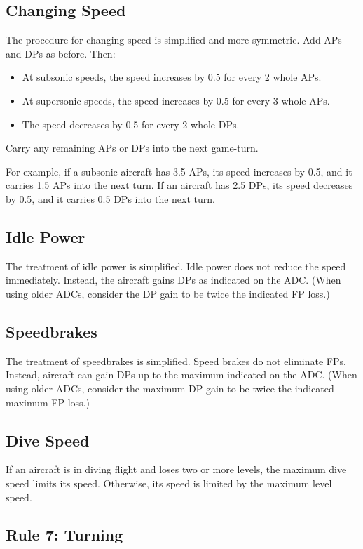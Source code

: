 \documentclass[10pt]{article}
\begin{document}
\subsection{Changing Speed} The procedure for changing speed is simplified and more symmetric. Add APs and DPs as before. Then: 
\begin{itemize}
    \item At subsonic speeds, the speed increases by 0.5 for every 2 whole APs. 
    \item At supersonic speeds, the speed increases by 0.5 for every 3 whole APs. 
    \item The speed decreases by 0.5 for every 2 whole DPs.
\end{itemize}
Carry any remaining APs or DPs into the next game-turn. 

For example, if a subsonic aircraft has 3.5 APs, its speed increases by 0.5, and it carries 1.5 APs into the next turn. If an aircraft has 2.5 DPs, its speed decreases by 0.5, and it carries 0.5 DPs into the next turn.

\subsection{Idle Power} The treatment of idle power is simplified. Idle power does not reduce the speed immediately. Instead, the aircraft gains DPs as indicated on the ADC. (When using older ADCs, consider the DP gain to be twice the indicated FP loss.)

\subsection{Speedbrakes} The treatment of speedbrakes is simplified. Speed brakes do not eliminate FPs. Instead, aircraft can gain DPs up to the maximum indicated on the ADC. (When using older ADCs, consider the maximum DP gain to be twice the indicated maximum FP loss.)

\subsection{Dive Speed} If an aircraft is in diving flight and loses two or more levels, the maximum dive speed limits its speed. Otherwise, its speed is limited by the maximum level speed.

\subsection{Rule 7: Turning}
\end{document}
